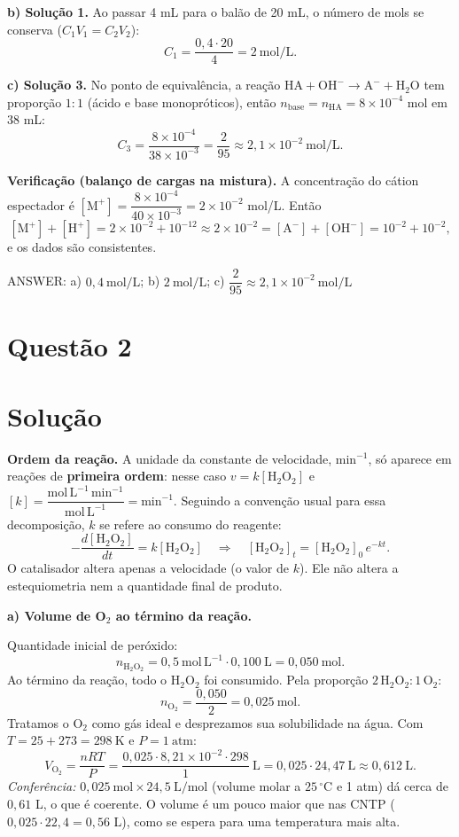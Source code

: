 \documentclass{article}%
\begin{document}
\textbf{b) Solução 1.} Ao passar 4 mL para o balão de 20 mL, o número de mols se conserva ($C_1V_1 = C_2V_2$):
\[
C_1 = \frac{0{,}4\cdot 20}{4} = 2\ \text{mol/L}.
\]

\textbf{c) Solução 3.} No ponto de equivalência, a reação $\text{HA} + \text{OH}^- \to \text{A}^- + \text{H}_2\text{O}$ tem proporção $1:1$ (ácido e base monopróticos), então $n_{\text{base}} = n_{\text{HA}} = 8\times10^{-4}$ mol em 38 mL:
\[
C_3 = \frac{8\times 10^{-4}}{38\times 10^{-3}} = \frac{2}{95} \approx 2{,}1\times 10^{-2}\ \text{mol/L}.
\]

\textbf{Verificação (balanço de cargas na mistura).} A concentração do cátion espectador é $[\text{M}^+] = \dfrac{8\times10^{-4}}{40\times10^{-3}} = 2\times10^{-2}$ mol/L. Então
\[
[\text{M}^+] + [\text{H}^+] = 2\times10^{-2} + 10^{-12} \approx 2\times 10^{-2} = [\text{A}^-] + [\text{OH}^-] = 10^{-2} + 10^{-2},
\]
e os dados são consistentes.

ANSWER: a) $0{,}4\ \text{mol/L}$; b) $2\ \text{mol/L}$; c) $\dfrac{2}{95} \approx 2{,}1\times 10^{-2}\ \text{mol/L}$%
\newpage%
\section*{Questão 2}

\section*{Solução}

\textbf{Ordem da reação.} A unidade da constante de velocidade, $\text{min}^{-1}$, só aparece em reações de \textbf{primeira ordem}: nesse caso $v=k[\text{H}_2\text{O}_2]$ e $[k]=\dfrac{\text{mol}\,\text{L}^{-1}\,\text{min}^{-1}}{\text{mol}\,\text{L}^{-1}}=\text{min}^{-1}$. Seguindo a convenção usual para essa decomposição, $k$ se refere ao consumo do reagente:
\[
-\frac{d[\text{H}_2\text{O}_2]}{dt}=k[\text{H}_2\text{O}_2]
\quad\Longrightarrow\quad
[\text{H}_2\text{O}_2]_t=[\text{H}_2\text{O}_2]_0\,e^{-kt}.
\]
O catalisador altera apenas a velocidade (o valor de $k$). Ele não altera a estequiometria nem a quantidade final de produto.

\medskip
\textbf{a) Volume de O$_2$ ao término da reação.}

Quantidade inicial de peróxido:
\[
n_{\text{H}_2\text{O}_2}=0{,}5\ \text{mol}\,\text{L}^{-1}\cdot 0{,}100\ \text{L}=0{,}050\ \text{mol}.
\]
Ao término da reação, todo o $\text{H}_2\text{O}_2$ foi consumido. Pela proporção $2\,\text{H}_2\text{O}_2:1\,\text{O}_2$:
\[
n_{\text{O}_2}=\frac{0{,}050}{2}=0{,}025\ \text{mol}.
\]
Tratamos o O$_2$ como gás ideal e desprezamos sua solubilidade na água. Com $T=25+273=298\ \text{K}$ e $P=1\ \text{atm}$:
\[
V_{\text{O}_2}=\frac{nRT}{P}=\frac{0{,}025\cdot 8{,}21\times10^{-2}\cdot 298}{1}\ \text{L}
=0{,}025\cdot 24{,}47\ \text{L}\approx 0{,}612\ \text{L}.
\]
\textit{Conferência:} $0{,}025\ \text{mol}\times 24{,}5\ \text{L/mol}$ (volume molar a $25\,^{\circ}$C e 1 atm) dá cerca de $0{,}61$ L, o que é coerente. O volume é um pouco maior que nas CNTP ($0{,}025\cdot 22{,}4=0{,}56$ L), como se espera para uma temperatura mais alta.
\end{document}
